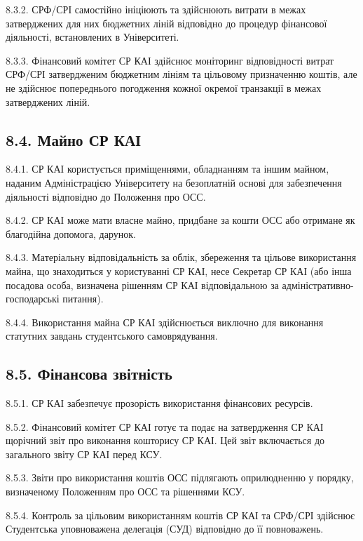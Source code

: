     8.3.2. СРФ/СРІ самостійно ініціюють та здійснюють витрати в межах затверджених для них бюджетних ліній відповідно до процедур фінансової діяльності, встановлених в Університеті.

    8.3.3. Фінансовий комітет СР КАІ здійснює моніторинг відповідності витрат СРФ/СРІ затвердженим бюджетним лініям та цільовому призначенню коштів, але не здійснює попереднього погодження кожної окремої транзакції в межах затверджених ліній.

\subsection*{8.4. Майно СР КАІ}
    8.4.1. СР КАІ користується приміщеннями, обладнанням та іншим майном, наданим Адміністрацією Університету на безоплатній основі для забезпечення діяльності відповідно до Положення про ОСС.

    8.4.2. СР КАІ може мати власне майно, придбане за кошти ОСС або отримане як благодійна допомога, дарунок.

    8.4.3. Матеріальну відповідальність за облік, збереження та цільове використання майна, що знаходиться у користуванні СР КАІ, несе Секретар СР КАІ (або інша посадова особа, визначена рішенням СР КАІ відповідальною за адміністративно-господарські питання).

    8.4.4. Використання майна СР КАІ здійснюється виключно для виконання статутних завдань студентського самоврядування.

\subsection*{8.5. Фінансова звітність}
    8.5.1. СР КАІ забезпечує прозорість використання фінансових ресурсів.

    8.5.2. Фінансовий комітет СР КАІ готує та подає на затвердження СР КАІ щорічний звіт про виконання кошторису СР КАІ. Цей звіт включається до загального звіту СР КАІ перед КСУ.

    8.5.3. Звіти про використання коштів ОСС підлягають оприлюдненню у порядку, визначеному Положенням про ОСС та рішеннями КСУ.

    8.5.4. Контроль за цільовим використанням коштів СР КАІ та СРФ/СРІ здійснює Студентська уповноважена делегація (СУД) відповідно до її повноважень. 